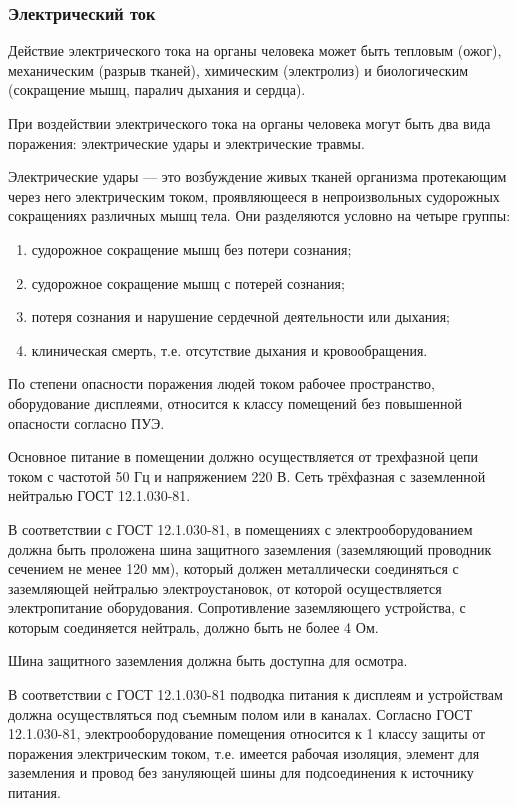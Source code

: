 \subsubsection{Электрический ток}

Действие электрического тока на органы человека может быть тепловым (ожог), механическим (разрыв тканей), химическим (электролиз) и биологическим (сокращение мышц, паралич дыхания и сердца).

При воздействии электрического тока на органы человека могут быть два вида поражения: электрические удары и электрические травмы.

Электрические удары --- это возбуждение живых тканей организма протекающим через него электрическим током, проявляющееся в непроизвольных судорожных сокращениях различных мышц тела.
Они разделяются условно на четыре группы:
\begin{enumerate}[label=\arabic*)] %
  \item{судорожное сокращение мышц без потери сознания;}
  \item{судорожное сокращение мышц с потерей сознания;}
  \item{потеря сознания и нарушение сердечной деятельности или дыхания;}
  \item{клиническая смерть, т.е. отсутствие дыхания и кровообращения.}
\end{enumerate}

По степени опасности поражения людей током рабочее пространство, оборудование дисплеями, относится к классу помещений без повышенной опасности согласно ПУЭ.

Основное питание в помещении должно осуществляется от трехфазной цепи током с частотой 50 Гц и напряжением 220 В.
Сеть трёхфазная с заземленной нейтралью ГОСТ 12.1.030-81.

В соответствии с ГОСТ 12.1.030-81, в помещениях с электрооборудованием должна быть проложена шина защитного заземления (заземляющий проводник сечением не менее 120 мм), который должен металлически соединяться с заземляющей нейтралью электроустановок, от которой осуществляется электропитание оборудования.
Сопротивление заземляющего устройства, с которым соединяется нейтраль, должно быть не более 4 Ом.

Шина защитного заземления должна быть доступна для осмотра.

В соответствии с ГОСТ 12.1.030-81 подводка питания к дисплеям и устройствам должна осуществляться под съемным полом или в каналах.
Согласно ГОСТ 12.1.030-81, электрооборудование помещения относится к 1 классу защиты от поражения электрическим током, т.е. имеется рабочая изоляция, элемент для заземления и провод без зануляющей шины для подсоединения к источнику питания.

